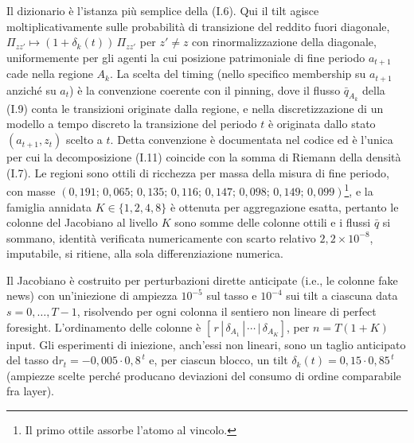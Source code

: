 \documentclass[11pt,a4paper]{article}
\newcommand{\dd}{\mathrm{d}}
\begin{document}
Il dizionario \`e l'istanza pi\`u semplice della (I.6). Qui il tilt agisce moltiplicativamente sulle probabilit\`a di transizione del reddito fuori diagonale, $\Pi_{zz'}\mapsto(1+\delta_k(t))\,\Pi_{zz'}$ per $z'\neq z$ con rinormalizzazione della diagonale, uniformemente per gli agenti la cui posizione patrimoniale di fine periodo $a_{t+1}$ cade nella regione $A_k$. La scelta del timing (nello specifico membership su $a_{t+1}$ anzich\'e su $a_t$) \`e la convenzione coerente con il pinning, dove il flusso $\bar q_{A_k}$ della (I.9) conta le transizioni originate dalla regione, e nella discretizzazione di un modello a tempo discreto la transizione del periodo $t$ \`e originata dallo stato $(a_{t+1},z_t)$ scelto a $t$. Detta convenzione \`e documentata nel codice ed \`e l'unica per cui la decomposizione (I.11) coincide con la somma di Riemann della densit\`a (I.7). Le regioni sono ottili di ricchezza per massa della misura di fine periodo, con masse $(0{,}191;\,0{,}065;\,0{,}135;\,0{,}116;\,0{,}147;\,0{,}098;\,0{,}149;\,0{,}099)$\footnote{Il primo ottile assorbe l'atomo al vincolo.}, e la famiglia annidata $K\in\{1,2,4,8\}$ \`e ottenuta per aggregazione esatta, pertanto le colonne del Jacobiano al livello $K$ sono somme delle colonne ottili e i flussi $\bar q$ si sommano, identit\`a verificata numericamente con scarto relativo $2{,}2\times10^{-8}$, imputabile, si ritiene, alla sola differenziazione numerica.

Il Jacobiano \`e costruito per perturbazioni dirette anticipate (i.e., le colonne fake news) con un'iniezione di ampiezza $10^{-5}$ sul tasso e $10^{-4}$ sui tilt a ciascuna data $s=0,\dots,T-1$, risolvendo per ogni colonna il sentiero non lineare di perfect foresight. L'ordinamento delle colonne \`e $[\,r\,|\,\delta_{A_1}\,|\,\cdots\,|\,\delta_{A_K}]$, per $n=T(1+K)$ input. Gli esperimenti di iniezione, anch'essi non lineari, sono un taglio anticipato del tasso $\dd r_t=-0{,}005\cdot0{,}8^{\,t}$ e, per ciascun blocco, un tilt $\delta_k(t)=0{,}15\cdot0{,}85^{\,t}$ (ampiezze scelte perch\'e producano deviazioni del consumo di ordine comparabile fra layer).
\end{document}

